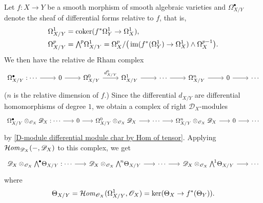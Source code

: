 Let $f:X\to Y$ be a smooth morphism of smooth algebraic varieties and $\Omega_{X/Y}^\bullet$ denote the sheaf of differential forms relative to $f$, that is,
\begin{align}
\Omega_{X/Y}^1&=\coker(f^*\Omega_Y^1\to\Omega_X^1),\label{D-module relative differential form def-1} \\
\Omega_{X/Y}^p&=\bigw^p\Omega_{X/Y}^1=\Omega_X^p/\big(\im(f^*(\Omega_Y^1)\to \Omega_X^1)\wedge \Omega_X^{p-1}\big).\label{D-module relative differential form def-2}
\end{align}
We then have the relative de Rham complex
\[\begin{tikzcd}
\Omega_{X/Y}^\bullet:\cdots\ar[r]&0\ar[r]&\Omega_{X/Y}^0\ar[r,"d^0_{X/Y}"]&\Omega_{X/Y}^1\ar[r]&\cdots\ar[r]&\Omega_{X/Y}^n\ar[r]&0\ar[r]&\cdots 
\end{tikzcd}
\]
($n$ is the relative dimension of $f$.) Since the differential $d_{X/Y}$ are differential homomorphisms of degree $1$, we obtain a complex of right $\mathscr{D}_X$-modules
\[\begin{tikzcd}[column sep=6mm]
\Omega_{X/Y}^\bullet\otimes_{\mathscr{O}_X}\mathscr{D}_X:\cdots\ar[r]&0\ar[r]&\Omega_{X/Y}^0\otimes_{\mathscr{O}_X}\mathscr{D}_X\ar[r]&\cdots\ar[r]&\Omega_{X/Y}^n\otimes_{\mathscr{O}_X}\mathscr{D}_X\ar[r]&0\ar[r]&\cdots 
\end{tikzcd}
\]
by \cref{D-module differential module char by Hom of tensor}. Applying $\operatorname{\mathcal{H}\hspace*{-0.4pt}\textit{om}\hspace{0.5pt}}_{\mathscr{D}_X}(-,\mathscr{D}_X)$ to this complex, we get
\[\begin{tikzcd}[column sep=6mm]
\mathscr{D}_X\otimes_{\mathscr{O}_X}\bigw^\bullet\Theta_{X/Y}:\cdots\ar[r]&\mathscr{D}_X\otimes_{\mathscr{O}_X}\bigw^n\Theta_{X/Y}\ar[r]&\cdots\ar[r]&\mathscr{D}_X\otimes_{\mathscr{O}_X}\bigw^1\Theta_{X/Y}\ar[r]&\cdots 
\end{tikzcd}
\]
where 
\[\Theta_{X/Y}=\operatorname{\mathcal{H}\hspace*{-0.4pt}\textit{om}\hspace{0.5pt}}_{\mathscr{O}_X}(\Omega_{X/Y}^1,\mathscr{O}_X)=\operatorname{ker}(\Theta_X\to f^*(\Theta_Y)).\]

